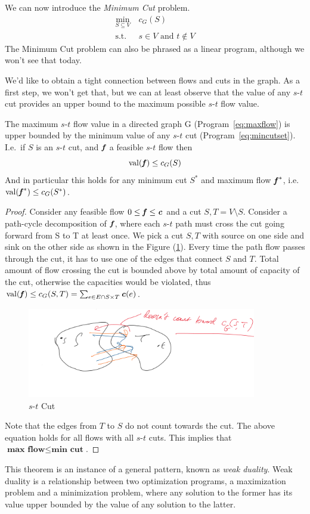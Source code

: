 We can now introduce the \emph{Minimum Cut} problem.
%
\begin{align}
   \label{eq:mincutset}
\min_{S \subseteq V } \ & c_G(S)\\ \nonumber
\textrm{s.t. } & s \in V \text{ and } t \not\in V
\end{align}
The Minimum Cut problem can also be phrased as a linear program,
although we won't see that today.

We'd like to obtain a tight connection between flows and cuts in the
graph.
As a first step, we won't get that, but we can at least observe that the value of any $s$-$t$ cut
provides an upper bound to the maximum possible $s$-$t$ flow value.

\begin{theorem} The maximum $s$-$t$ flow
  value in a directed graph G \mbox{(Program~\eqref{eq:maxflow})} is upper bounded by the minimum value of
  any $s$-$t$ cut (Program~\eqref{eq:mincutset}).
  I.e.\ if $S$ is an $s$-$t$ cut, and $\boldsymbol{\mathit{f}}$ a feasible $s$-$t$ flow
  then
  \[
    \operatorname*{val}(\boldsymbol{\mathit{f}}) \leq c_G(S)
  \]
  And in particular this holds for any minimum cut $S^*$ and maximum
  flow $\boldsymbol{\mathit{f}}^*$, i.e.\
  $\operatorname*{val}(\boldsymbol{\mathit{f}}^*) \leq c_G(S^*)$.
\end{theorem}
\begin{proof}


Consider any feasible flow  \(0 \leq \boldsymbol{\mathit{f}} \leq \boldsymbol{\mathit{c}} \) and a cut \(S,T = V\setminus S\).
Consider a path-cycle decomposition of
\(\boldsymbol{\mathit{f}}\), where each $s$-$t$ path must cross the cut going forward from
S to T at least once. We pick a cut $S,T$ with source on one side and
sink on the other side as shown in the Figure (\ref{fig:ex5}). Every
time the path flow passes through the cut, it has to use one of the
edges that connect $S$ and $T$. Total amount of flow crossing the cut
is bounded above by total amount of capacity of the cut, otherwise the
capacities would be violated, thus
$ \operatorname*{val}(\boldsymbol{\mathit{f}}) \leq c_{G}(S,T) = \sum_{e\in E \cap S \times T}{\boldsymbol{\mathit{c}}(e)}$.
\begin{figure}[H]
 \centering
  \includegraphics[width=100mm,scale=0.5]{fig/fig5_lec10.PNG}
  \caption{$s$-$t$ Cut}\label{fig:ex5}
\end{figure}
Note that the edges from $T$ to $S$ do not count towards the cut. The above equation holds for all flows with all $s$-$t$ cuts. This implies that
    $\textbf{max flow} \leq \textbf{min cut}$.
\end{proof}
This theorem is an instance of a general pattern, known as \emph{weak
duality}. Weak duality is a relationship between two optimization programs, a maximization
problem and a minimization problem, where any solution to the former has
its value upper bounded by the value of any solution to the latter.


